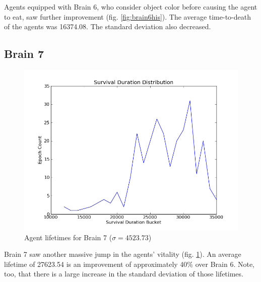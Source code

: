 Agents equipped with Brain 6, who consider object color before causing the 
agent to eat, saw further improvement (fig. \ref{fig:brain6his}). The average 
time-to-death of the agents was 16374.08. The standard deviation also decreased.


\subsection{Brain 7}
\begin{figure}
\begin{center}
  \includegraphics[scale=.65]{plots/brain7hist.png}
  \caption{Agent lifetimes for Brain 7 ($\sigma = 4523.73$)}
  \label{fig:brain7his}
\end{center}
\end{figure}

Brain 7 saw another massive jump in the agents' vitality 
(fig. \ref{fig:brain7his}). An average lifetime of 27623.54 is an improvement
of approximately 40\% over Brain 6. Note, too, that there is a large increase 
in the standard deviation of those lifetimes.


